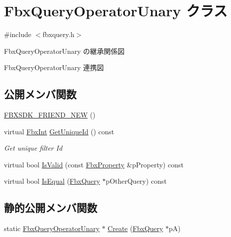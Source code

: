 \hypertarget{class_fbx_query_operator_unary}{}\section{Fbx\+Query\+Operator\+Unary クラス}
\label{class_fbx_query_operator_unary}


{\ttfamily \#include $<$fbxquery.\+h$>$}



Fbx\+Query\+Operator\+Unary の継承関係図


Fbx\+Query\+Operator\+Unary 連携図
\subsection*{公開メンバ関数}
\begin{DoxyCompactItemize}
\item 
\hyperlink{class_fbx_query_operator_unary_a960083d88f202ec081974d82f2720fe2}{F\+B\+X\+S\+D\+K\+\_\+\+F\+R\+I\+E\+N\+D\+\_\+\+N\+EW} ()
\item 
virtual \hyperlink{fbxtypes_8h_a088fa96de3b0b3ea69f0f6afef525dfb}{Fbx\+Int} \hyperlink{class_fbx_query_operator_unary_ac2e7dbfc697aee51db49db2857ab2b7c}{Get\+Unique\+Id} () const
\begin{DoxyCompactList}\small\item\em Get unique filter Id \end{DoxyCompactList}\item 
virtual bool \hyperlink{class_fbx_query_operator_unary_a4987590ec1680775240b813ec3b2ffb4}{Is\+Valid} (const \hyperlink{class_fbx_property}{Fbx\+Property} \&p\+Property) const
\item 
virtual bool \hyperlink{class_fbx_query_operator_unary_a36c2fea0f42bd732d559375d64b0134e}{Is\+Equal} (\hyperlink{class_fbx_query}{Fbx\+Query} $\ast$p\+Other\+Query) const
\end{DoxyCompactItemize}
\subsection*{静的公開メンバ関数}
\begin{DoxyCompactItemize}
\item 
static \hyperlink{class_fbx_query_operator_unary}{Fbx\+Query\+Operator\+Unary} $\ast$ \hyperlink{class_fbx_query_operator_unary_a7ad77bd7ddd3818204a19513c7b09c2c}{Create} (\hyperlink{class_fbx_query}{Fbx\+Query} $\ast$pA)
\end{DoxyCompactItemize}
